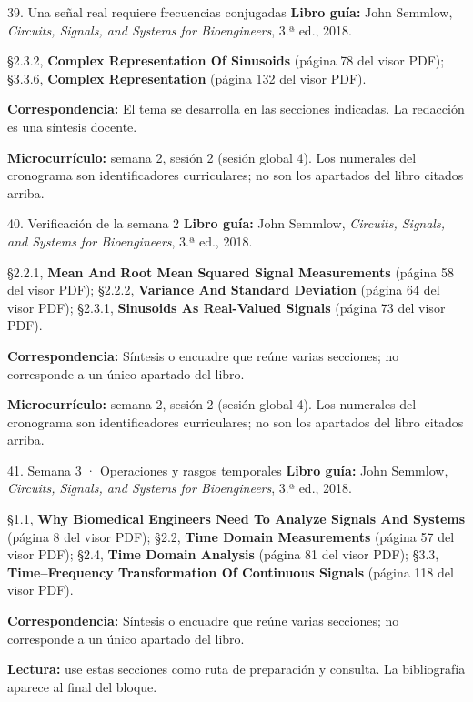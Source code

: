 \documentclass[
  10pt,
  ignorenonframetext,
  aspectratio=169,
  spanish,
]{beamer}
\begin{document}
\begin{frame}{39. Una señal real requiere frecuencias conjugadas}
\label{una-seuxf1al-real-requiere-frecuencias-conjugadas}
\textbf{Libro guía:} John Semmlow, \emph{Circuits, Signals, and Systems
for Bioengineers}, 3.ª ed., 2018.

§2.3.2, \textbf{Complex Representation Of Sinusoids} (página 78 del
visor PDF); §3.3.6, \textbf{Complex Representation} (página 132 del
visor PDF).

\textbf{Correspondencia:} El tema se desarrolla en las secciones
indicadas. La redacción es una síntesis docente.

\textbf{Microcurrículo:} semana 2, sesión 2 (sesión global 4). Los
numerales del cronograma son identificadores curriculares; no son los
apartados del libro citados arriba.
\end{frame}

\begin{frame}{40. Verificación de la semana 2}
\label{verificaciuxf3n-de-la-semana-2}
\textbf{Libro guía:} John Semmlow, \emph{Circuits, Signals, and Systems
for Bioengineers}, 3.ª ed., 2018.

§2.2.1, \textbf{Mean And Root Mean Squared Signal Measurements} (página
58 del visor PDF); §2.2.2, \textbf{Variance And Standard Deviation}
(página 64 del visor PDF); §2.3.1, \textbf{Sinusoids As Real-Valued
Signals} (página 73 del visor PDF).

\textbf{Correspondencia:} Síntesis o encuadre que reúne varias
secciones; no corresponde a un único apartado del libro.

\textbf{Microcurrículo:} semana 2, sesión 2 (sesión global 4). Los
numerales del cronograma son identificadores curriculares; no son los
apartados del libro citados arriba.
\end{frame}

\begin{frame}{41. Semana 3 · Operaciones y rasgos temporales}
\label{semana-3-operaciones-y-rasgos-temporales}
\textbf{Libro guía:} John Semmlow, \emph{Circuits, Signals, and Systems
for Bioengineers}, 3.ª ed., 2018.

§1.1, \textbf{Why Biomedical Engineers Need To Analyze Signals And
Systems} (página 8 del visor PDF); §2.2, \textbf{Time Domain
Measurements} (página 57 del visor PDF); §2.4, \textbf{Time Domain
Analysis} (página 81 del visor PDF); §3.3, \textbf{Time--Frequency
Transformation Of Continuous Signals} (página 118 del visor PDF).

\textbf{Correspondencia:} Síntesis o encuadre que reúne varias
secciones; no corresponde a un único apartado del libro.

\textbf{Lectura:} use estas secciones como ruta de preparación y
consulta. La bibliografía aparece al final del bloque.
\end{frame}
\end{document}
